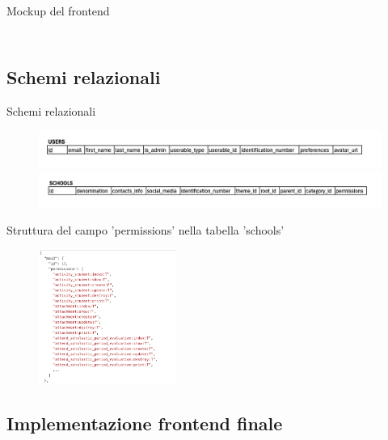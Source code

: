 \documentclass[aspectratio=169]{beamer}
\begin{document}
\begin{frame}[fragile]{Mockup del frontend}
\begin{columns}[T]
\begin{column}{0.3\textwidth}
\begin{figure}
			\end{figure}
		\end{column}
	\end{columns}
\end{frame}

\subsection{Schemi relazionali}

\begin{frame}[fragile]{Schemi relazionali}
	\begin{figure}
		\centering
		\includegraphics[width=\textwidth]{../images/schema-relazionale-users.png}
		\includegraphics[width=\textwidth]{../images/schema-relazionale-schools.png}
	\end{figure}
\end{frame}

\begin{frame}[fragile]{Struttura del campo 'permissions' nella tabella 'schools'}
	\begin{figure}
		\centering
		\includegraphics[width=0.4\textwidth]{../images/campo-permissions.png}
	\end{figure}
\end{frame}

\subsection{Implementazione frontend finale}
\end{document}
